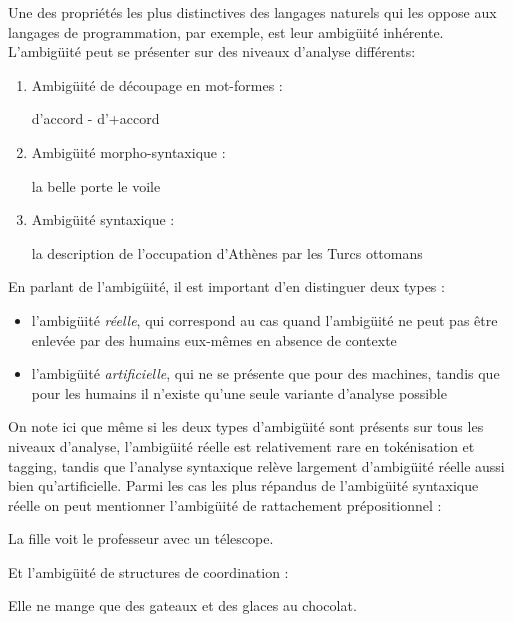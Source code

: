 \documentclass[12pt]{article}
\begin{document}
Une des propri\'et\'es les plus distinctives des langages naturels qui les
oppose aux langages de programmation, par exemple, est leur ambig\"uit\'e inh\'erente. L'ambig\"uit\'e peut se pr\'esenter sur des niveaux d'analyse diff\'erents:

\begin{enumerate}
\item Ambig\"uit\'e de d\'ecoupage en mot-formes :
\begin{exe}
\ex d'accord - d'+accord
\end{exe}
\item Ambig\"uit\'e morpho-syntaxique :
\begin{exe}
\ex la belle porte le voile
\end{exe}
\item Ambig\"uit\'e syntaxique :
\begin{exe}
\ex la description de l'occupation d'Ath\`enes par les Turcs ottomans
\end{exe}
\end{enumerate}


En parlant de l'ambig\"uit\'e, il est important d'en distinguer deux types :
\begin{itemize}
  \item l'ambig\"uit\'e \emph{r\'eelle}, qui correspond au cas quand l'ambig\"uit\'e
ne peut pas \^etre enlev\'ee par des humains eux-m\^emes en absence de contexte
\item l'ambig\"uit\'e \emph{artificielle}, qui ne se pr\'esente que pour des machines,
tandis que pour les humains il n'existe qu'une seule variante d'analyse possible
\end{itemize}

On note ici que m\^eme si les deux types d'ambig\"uit\'e sont pr\'esents sur tous les niveaux d'analyse, l'ambig\"uit\'e r\'eelle est relativement rare en tok\'enisation et tagging, tandis que l'analyse syntaxique
rel\`eve largement d'ambig\"uit\'e r\'eelle aussi bien qu'artificielle. Parmi les cas les plus r\'epandus de l'ambig\"uit\'e syntaxique r\'eelle on peut mentionner l'ambig\"uit\'e de rattachement pr\'epositionnel :

\begin{exe}
\ex La fille voit le professeur avec un t\'elescope.
\end{exe}

Et l'ambig\"uit\'e de structures de coordination :

\begin{exe}
\ex Elle ne mange que des gateaux et des glaces au chocolat.
\end{exe}
\end{document}
